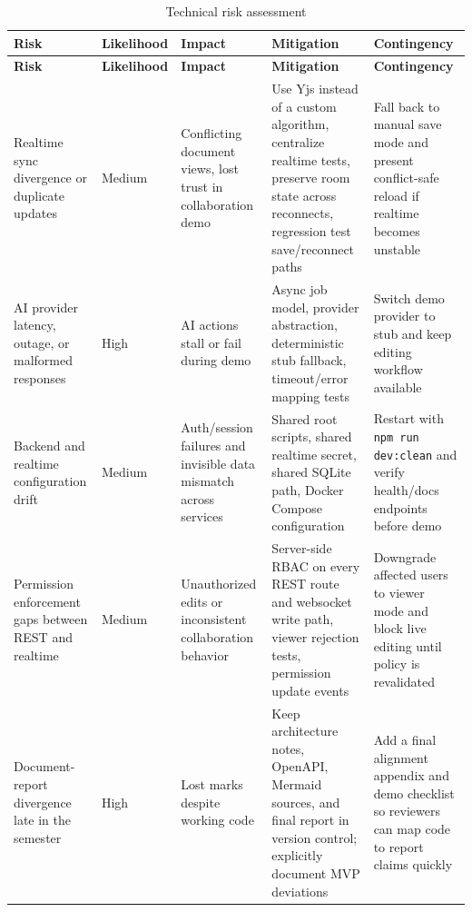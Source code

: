 \begin{longtable}{p{3.1cm}p{1.8cm}p{3.0cm}p{4.6cm}p{3.8cm}}
\caption{Technical risk assessment}\label{tab:risk-assessment}\\
\toprule
\textbf{Risk} & \textbf{Likelihood} & \textbf{Impact} & \textbf{Mitigation} & \textbf{Contingency} \\
\midrule
\endfirsthead
\toprule
\textbf{Risk} & \textbf{Likelihood} & \textbf{Impact} & \textbf{Mitigation} & \textbf{Contingency} \\
\midrule
\endhead
Realtime sync divergence or duplicate updates & Medium & Conflicting document views, lost trust in collaboration demo & Use Yjs instead of a custom algorithm, centralize realtime tests, preserve room state across reconnects, regression test save/reconnect paths & Fall back to manual save mode and present conflict-safe reload if realtime becomes unstable \\
AI provider latency, outage, or malformed responses & High & AI actions stall or fail during demo & Async job model, provider abstraction, deterministic stub fallback, timeout/error mapping tests & Switch demo provider to stub and keep editing workflow available \\
Backend and realtime configuration drift & Medium & Auth/session failures and invisible data mismatch across services & Shared root scripts, shared realtime secret, shared SQLite path, Docker Compose configuration & Restart with \texttt{npm run dev:clean} and verify health/docs endpoints before demo \\
Permission enforcement gaps between REST and realtime & Medium & Unauthorized edits or inconsistent collaboration behavior & Server-side RBAC on every REST route and websocket write path, viewer rejection tests, permission update events & Downgrade affected users to viewer mode and block live editing until policy is revalidated \\
Document-report divergence late in the semester & High & Lost marks despite working code & Keep architecture notes, OpenAPI, Mermaid sources, and final report in version control; explicitly document MVP deviations & Add a final alignment appendix and demo checklist so reviewers can map code to report claims quickly \\
\bottomrule
\end{longtable}
